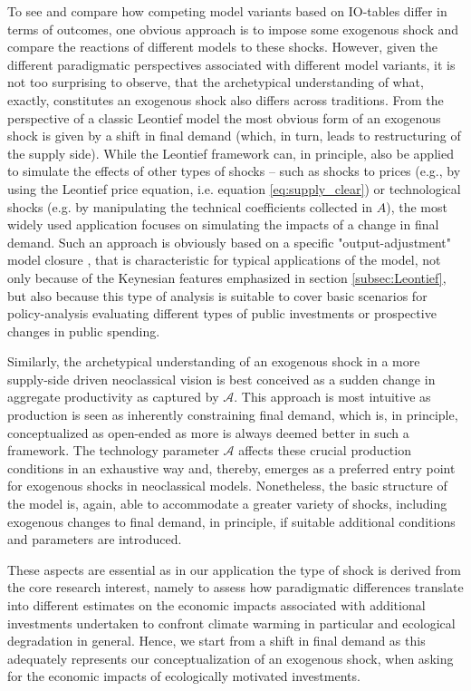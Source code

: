 \documentclass{article}
\begin{document}
To see and compare how competing model variants based on IO-tables differ in terms of outcomes, one obvious approach is to impose some exogenous shock and compare the reactions of different models to these shocks. However, given the different paradigmatic perspectives associated with different model variants, it is not too surprising to observe, that the archetypical understanding of what, exactly, constitutes an exogenous shock also differs across traditions. From the perspective of a classic Leontief model the most obvious form of an exogenous shock is given by a shift in final demand (which, in turn, leads to restructuring of the supply side). While the Leontief framework can, in principle, also be applied to simulate the effects of other types of shocks -- such as shocks to prices (e.g., by using the Leontief price equation, i.e. equation \eqref{eq:supply_clear}) or technological shocks (e.g. by manipulating the technical coefficients collected in $A$), the most widely used application focuses on simulating the impacts of a change in final demand. Such an approach is obviously based on a specific "output-adjustment" model closure \citep{Taylor1990}, that is characteristic for typical applications of the model, not only because of the Keynesian features emphasized in section \ref{subsec:Leontief}, but also because this type of analysis is suitable to cover basic scenarios for policy-analysis evaluating different types of public investments or prospective changes in public spending.

Similarly, the archetypical understanding of an exogenous shock in a more supply-side driven neoclassical vision is best conceived as a sudden change in aggregate productivity as captured by $\mathbf{\mathcal A}$. This approach is most intuitive as production is seen as inherently constraining final demand, which is, in principle, conceptualized as open-ended as more is always deemed better in such a framework. The technology parameter $\mathbf{\mathcal A}$ affects these crucial production conditions in an exhaustive way and, thereby, emerges as a preferred entry point for exogenous shocks in neoclassical models. Nonetheless, the basic structure of the model is, again, able to accommodate a greater variety of shocks, including exogenous changes to final demand, in principle, if suitable additional conditions and parameters are introduced.

These aspects are essential as in our application the type of shock is derived from the core research interest, namely to assess how paradigmatic differences translate into different estimates on the economic impacts associated with additional investments undertaken to confront climate warming in particular and ecological degradation in general. Hence, we start from a shift in final demand as this adequately represents our conceptualization of an exogenous shock, when asking for the economic impacts of ecologically motivated investments.
\end{document}
